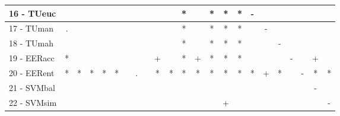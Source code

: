 \begin{table}[h]
\begin{center}
\begin{tabular}{lcc|cc|cc|cc|cc|cc|cc|cc|cc|cc|cc}
16 - TUeuc	&   &   &   &   &   &   &   &   &   &   & * &   & * & * & * & - &   &   &   &   &   &   \\ \hline
17 - TUman	& . &   &   &   &   &   &   &   &   &   & * &   & * & * & * &   & - &   &   &   &   &   \\
18 - TUmah	&   &   &   &   &   &   &   &   &   &   & * &   & * & * & * &   &   & - &   &   &   &   \\ \hline
19 - EERacc	& * &   &   &   &   &   &   &   & + &   & * & + & * & * & * &   &   &   & - &   & + &   \\
20 - EERent	& * & * & * & * & * &   & . &   & * & * & * & * & * & * & * & * & + & * &   & - & * & * \\ \hline
21 - SVMbal	&   &   &   &   &   &   &   &   &   &   &   &   &   &   &   &   &   &   &   &   & - &   \\
22 - SVMsim	&   &   &   &   &   &   &   &   &   &   &   &   &   & + &   &   &   &   &   &   &   & - \\ \hline\end{tabular}

\label{stratsfriedSVM}
\end{center}
\end{table}